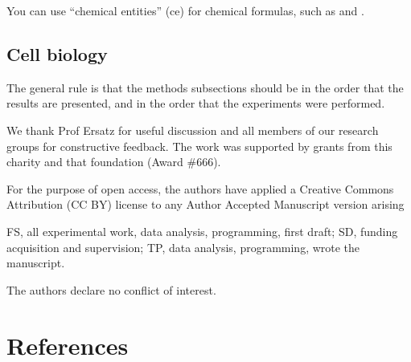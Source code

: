 You can use ``chemical entities'' (ce) for chemical formulas, such as  and .

\subsection*{Cell biology}

The general rule is that the methods subsections should be in the order that the results are presented, and in the order that the experiments were performed.

\lipsum[80]

\begin{acknowledgements}
We thank Prof Ersatz for useful discussion and all members of our research groups for constructive feedback.
The work was supported by grants from this charity and that foundation (Award \#666).

For the purpose of open access, the authors have applied a Creative Commons Attribution (CC BY) license to any Author Accepted Manuscript version arising
\end{acknowledgements}

\begin{contributions}
FS, all experimental work, data analysis, programming, first draft;
SD, funding acquisition and supervision;
TP, data analysis, programming, wrote the manuscript.
\end{contributions}

\begin{interests}
The authors declare no conflict of interest.
\end{interests}

\section*{References}

